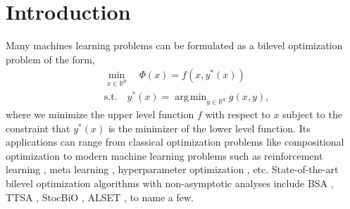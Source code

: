\documentclass{article}
\theoremstyle{plain}
\theoremstyle{definition}
\theoremstyle{remark}
\DeclareMathOperator*{\argmin}{arg\,min}
\newcommand{\R}{\mathbb{R}}
\begin{document}
\printAffiliationsAndNotice{}  %

\begin{abstract}
    Bilevel optimization recently has received tremendous attention due to its great success in solving important machine learning problems like meta learning, reinforcement learning, and hyperparameter optimization. Extending single-agent training on bilevel problems to the decentralized setting is a natural generalization, and there has been a flurry of work studying decentralized bilevel optimization algorithms. However, it remains unknown how to design the distributed algorithm with sample complexity and convergence rate comparable to SGD for stochastic optimization, and at the same time without directly computing the exact Hessian or Jacobian matrices. In this paper we propose such an algorithm. More specifically, we propose a novel decentralized stochastic bilevel optimization (DSBO) algorithm that only requires first order stochastic oracle, Hessian-vector product and Jacobian-vector product oracle. The sample complexity of our algorithm matches the currently best known results for DSBO, while our algorithm does not require estimating the full Hessian and Jacobian matrices, thereby possessing to improved per-iteration complexity.
\end{abstract}

\section{Introduction}
Many machines learning problems can be formulated as a bilevel optimization problem of the form, \\
\begin{equation}\label{eq: bilevel_opt}
    \begin{aligned}
        &\min_{x\in\R^p}\quad \Phi(x) = f(x,y^*(x)) \\
        &\text{s.t.}\quad y^*(x) = \argmin_{y\in\mathbb{R}^{q}}g(x,y),
    \end{aligned}
\end{equation}
where we minimize the upper level function $f$ with respect to $x$ subject to the constraint that $y^*(x)$ is the minimizer of the lower level function. Its applications can range from classical optimization problems like compositional optimization \citep{chen2021closing} to modern machine learning problems such as reinforcement learning \citep{hong2020two}, meta learning \citep{snell2017prototypical, bertinetto2018meta, rajeswaran2019meta, ji2020convergence}, hyperparameter optimization \citep{pedregosa2016hyperparameter, franceschi2018bilevel}, etc. State-of-the-art bilevel optimization algorithms with non-asymptotic analyses include BSA \citep{ghadimi2018approximation}, TTSA \citep{hong2020two}, StocBiO \citep{ji2020convergence}, ALSET \citep{chen2021closing}, to name a few. 
\end{document}

